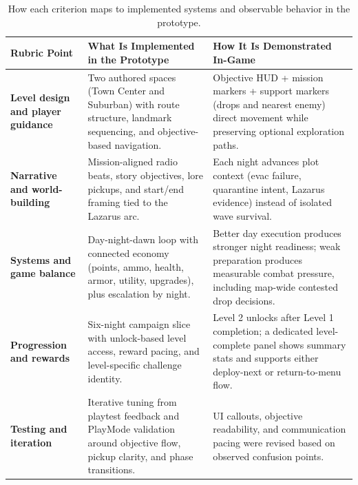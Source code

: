 \documentclass[11pt]{article}
\begin{document}
\begin{table}[H]
    \centering
    \begingroup
    \small
    \renewcommand{\arraystretch}{1.2}
    \setlength{\tabcolsep}{7pt}
    \begin{tabularx}{\textwidth}{>{\raggedright\bfseries\arraybackslash}p{} Y Y}
        \toprule
        Rubric Point & What Is Implemented in the Prototype & How It Is Demonstrated In-Game \\
        \midrule
        Level design and player guidance &
        Two authored spaces (Town Center and Suburban) with route structure, landmark sequencing, and objective-based navigation. &
        Objective HUD + mission markers + support markers (drops and nearest enemy) direct movement while preserving optional exploration paths. \\
        \addlinespace[0.25em]
        Narrative and world-building &
        Mission-aligned radio beats, story objectives, lore pickups, and start/end framing tied to the Lazarus arc. &
        Each night advances plot context (evac failure, quarantine intent, Lazarus evidence) instead of isolated wave survival. \\
        \addlinespace[0.25em]
        Systems and game balance &
        Day-night-dawn loop with connected economy (points, ammo, health, armor, utility, upgrades), plus escalation by night. &
        Better day execution produces stronger night readiness; weak preparation produces measurable combat pressure, including map-wide contested drop decisions. \\
        \addlinespace[0.25em]
        Progression and rewards &
        Six-night campaign slice with unlock-based level access, reward pacing, and level-specific challenge identity. &
        Level 2 unlocks after Level 1 completion; a dedicated level-complete panel shows summary stats and supports either deploy-next or return-to-menu flow. \\
        \addlinespace[0.25em]
        Testing and iteration &
        Iterative tuning from playtest feedback and PlayMode validation around objective flow, pickup clarity, and phase transitions. &
        UI callouts, objective readability, and communication pacing were revised based on observed confusion points. \\
        \bottomrule
    \end{tabularx}
    \endgroup
    \caption{How each criterion maps to implemented systems and observable behavior in the prototype.}
    \label{tab:rubric}
\end{table}
\end{document}
